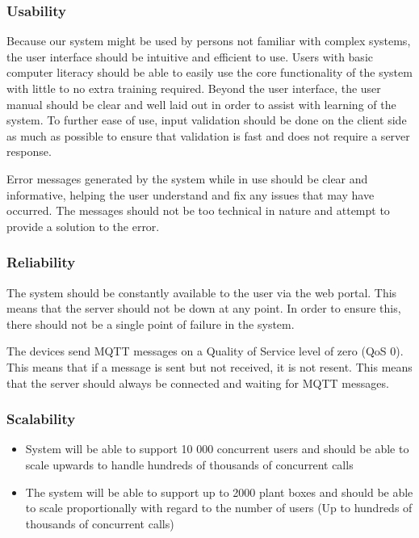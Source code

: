 \documentclass{article}
\begin{document}
		\subsubsection{Usability}
			Because our system might be used by persons not familiar with complex systems, the user interface should be intuitive and efficient to use. Users with basic computer literacy should be able to easily use the core functionality of the system with little to no extra training required. Beyond the user interface, the user manual should be clear and well laid out in order to assist with learning of the system. To further ease of use, input validation should be done on the client side as much as possible to ensure that validation is fast and does not require a server response.
			
			Error messages generated by the system while in use should be clear and informative, helping the user understand and fix any issues that may have occurred. The messages should not be too technical in nature and attempt to provide a solution to the error.
		\subsubsection{Reliability}
			The system should be constantly available to the user via the web portal. This means that the server should not be down at any point. In order to ensure this, there should not be a single point of failure in the system.
			
			The devices send MQTT messages on a Quality of Service level of zero (QoS 0). This means that if a message is sent but not received, it is not resent. This means that the server should always be connected and waiting for MQTT messages.
		\subsubsection{Scalability}
			
			\begin{itemize}
				\item System will be able to support 10 000 concurrent users and should be able to scale upwards to handle hundreds of thousands of concurrent calls
				\item The system will be able to support up to 2000 plant boxes and should be able to scale proportionally with regard to the number of users (Up to hundreds of thousands of concurrent calls)
			\end{itemize}
\end{document}
